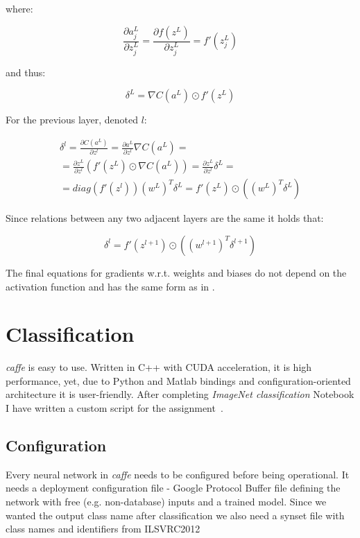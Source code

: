 \documentclass[journal, a4paper]{IEEEtran}
\begin{document}
    where:
    
    \begin{equation}
      \frac{\partial a_j^L}{\partial z_j^L} = \frac{\partial f(z^L)}{\partial z_j^L} = f'(z_j^L)
    \end{equation}
    
    and thus:
    
    \begin{equation}
      \delta^L = \nabla C(a^L) \odot f'(z^L)
    \end{equation}
    
    For the previous layer, denoted $l$:
    
    \begin{equation}
    \begin{gathered}
      \delta^l = \frac{\partial C(a^L)}{\partial z^l} = \frac{\partial a^L}{\partial z^l} \nabla C(a^L) = \\ = \frac{\partial z^L}{\partial z^l} (f'(z^L) \odot \nabla C(a^L) ) = \frac{\partial z^L}{\partial z^l} \delta^L = \\ = diag(f'(z^l))(w^L)^T \delta^L = f'(z^L) \odot ((w^L)^T \delta^L)
    \end{gathered}
    \end{equation}
    
    Since relations between any two adjacent layers are the same it holds that:
    
    \begin{equation}
      \delta^l  = f'(z^{l+1}) \odot ((w^{l+1})^T \delta^{l+1})
    \end{equation}
    
    The final equations for gradients w.r.t. weights and biases do not depend on the activation function and has the same form as in \cite{MLDL}.    
    		
\section {Classification}
  \textit{caffe} is easy to use. Written in C++ with CUDA acceleration, it is high performance, yet, due to Python and Matlab bindings and configuration-oriented architecture it is user-friendly. After completing \textit{ImageNet classification} Notebook I have written a custom script for the assignment~\cite{code}.
  
  \subsection{Configuration}
    Every neural network in \textit{caffe} needs to be configured before being operational. It needs a deployment configuration file - Google Protocol Buffer file defining the network with free (e.g. non-database) inputs and a trained model. Since we wanted the output class name after classification we also need a synset file with class names and identifiers from ILSVRC2012 \cite{ImageNet}
   
\end{document}
